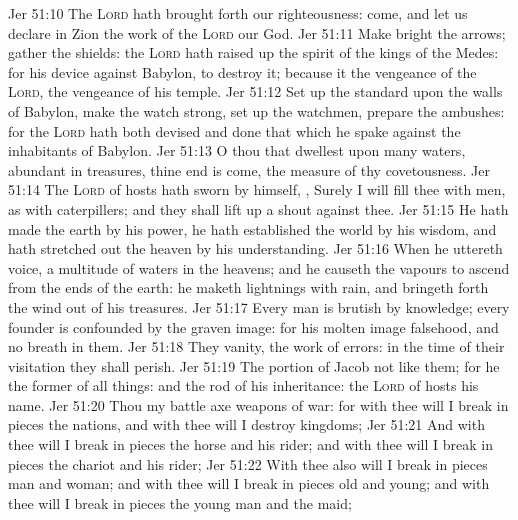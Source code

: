 \vs Jer 51:10 The \textsc{Lord} hath brought forth our righteousness: come, and let us declare in Zion the work of the \textsc{Lord} our God.
\vs Jer 51:11 Make bright the arrows; gather the shields: the \textsc{Lord} hath raised up the spirit of the kings of the Medes: for his device  against Babylon, to destroy it; because it  the vengeance of the \textsc{Lord}, the vengeance of his temple.
\vs Jer 51:12 Set up the standard upon the walls of Babylon, make the watch strong, set up the watchmen, prepare the ambushes: for the \textsc{Lord} hath both devised and done that which he spake against the inhabitants of Babylon.
\vs Jer 51:13 O thou that dwellest upon many waters, abundant in treasures, thine end is come,  the measure of thy covetousness.
\vs Jer 51:14 The \textsc{Lord} of hosts hath sworn by himself, , Surely I will fill thee with men, as with caterpillers; and they shall lift up a shout against thee.
\vs Jer 51:15 He hath made the earth by his power, he hath established the world by his wisdom, and hath stretched out the heaven by his understanding.
\vs Jer 51:16 When he uttereth  voice,  a multitude of waters in the heavens; and he causeth the vapours to ascend from the ends of the earth: he maketh lightnings with rain, and bringeth forth the wind out of his treasures.
\vs Jer 51:17 Every man is brutish by  knowledge; every founder is confounded by the graven image: for his molten image  falsehood, and  no breath in them.
\vs Jer 51:18 They  vanity, the work of errors: in the time of their visitation they shall perish.
\vs Jer 51:19 The portion of Jacob  not like them; for he  the former of all things: and  the rod of his inheritance: the \textsc{Lord} of hosts  his name.
\vs Jer 51:20 Thou  my battle axe  weapons of war: for with thee will I break in pieces the nations, and with thee will I destroy kingdoms;
\vs Jer 51:21 And with thee will I break in pieces the horse and his rider; and with thee will I break in pieces the chariot and his rider;
\vs Jer 51:22 With thee also will I break in pieces man and woman; and with thee will I break in pieces old and young; and with thee will I break in pieces the young man and the maid;
